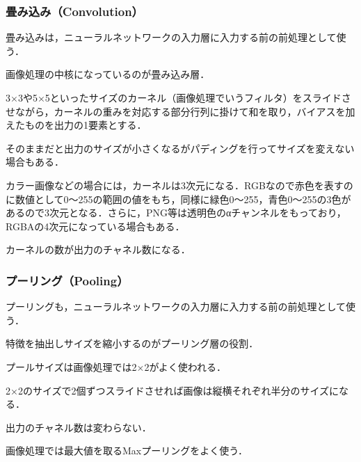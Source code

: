\documentclass[uplatex,titlepage]{jsarticle}
\newif\iffigure
\begin{document}
\subsubsection{畳み込み（Convolution）}
畳み込みは，ニューラルネットワークの入力層に入力する前の前処理として使う．
\iffigure
\begin{figure}[H]%
    \begin{center}
    \texttt{[image: convolution\_model.png]} 
    \caption{畳み込みのイメージ}
    \end{center}
\end{figure}
\fi
画像処理の中核になっているのが畳み込み層．\par
3×3や5×5といったサイズのカーネル（画像処理でいうフィルタ）をスライドさせながら，カーネルの重みを対応する部分行列に掛けて和を取り，バイアスを加えたものを出力の1要素とする．\par
そのままだと出力のサイズが小さくなるがパディングを行ってサイズを変えない場合もある．\par
カラー画像などの場合には，カーネルは3次元になる．RGBなので赤色を表すのに数値として0～255の範囲の値をもち，同様に緑色0～255，青色0～255の3色があるので3次元となる．さらに，PNG等は透明色のαチャンネルをもっており，RGBAの4次元になっている場合もある．\par
カーネルの数が出力のチャネル数になる．

\subsubsection{プーリング（Pooling）}
プーリングも，ニューラルネットワークの入力層に入力する前の前処理として使う．
\iffigure
\begin{figure}[H]%
    \begin{center}
    \texttt{[image: pooling\_model.png]} 
    \caption{プーリングのイメージ}
    \end{center}
\end{figure}
\fi
特徴を抽出しサイズを縮小するのがプーリング層の役割．\par
プールサイズは画像処理では2×2がよく使われる．\par
2×2のサイズで2個ずつスライドさせれば画像は縦横それぞれ半分のサイズになる．\par
出力のチャネル数は変わらない．\par
画像処理では最大値を取るMaxプーリングをよく使う．
\end{document}
